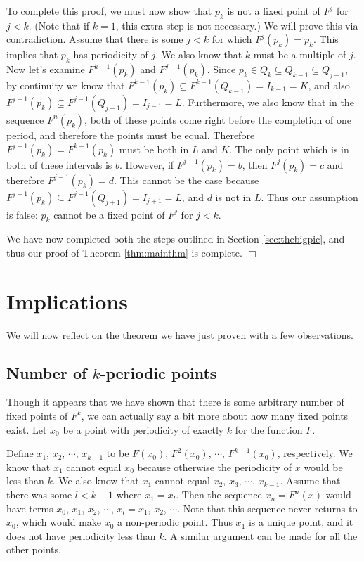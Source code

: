 \documentclass[12pt]{IEEEtran}
\begin{document}
To complete this proof, we must now show that $p_k$ is not a fixed point of $F^j$ for $j < k$. (Note that if $k = 1$, this extra step is not necessary.) We will prove this via contradiction. Assume that there is some $j < k$ for which $F^j \left( p_k \right) = p_k$. This implies that $p_k$ has periodicity of $j$. We also know that $k$ must be a multiple of $j$. Now let's examine $F^{k-1} \left( p_k \right)$ and $F^{j-1} \left( p_k \right)$. Since $p_k \in Q_k \subseteq Q_{k-1} \subseteq Q_{j-1}$, by continuity we know that $F^{k-1} \left( p_k \right) \subseteq F^{k-1} \left( Q_{k-1} \right) = I_{k-1} = K$, and also $F^{j-1} \left( p_k \right) \subseteq F^{j-1} \left( Q_{j-1} \right) = I_{j-1} = L$. Furthermore, we also know that in the sequence $F^n \left( p_k \right)$, both of these points come right before the completion of one period, and therefore the points must be equal. Therefore $F^{j-1} \left( p_k \right) = F^{k-1} \left( p_k \right)$ must be both in $L$ and $K$. The only point which is in both of these intervals is $b$. However, if $F^{j-1} \left( p_k \right) = b$, then $F^{j} \left( p_k \right) = c$ and therefore $F^{j-1} \left( p_k \right) = d$. This cannot be the case because $F^{j-1} \left( p_k \right) \subseteq F^{j-1} \left( Q_{j+1} \right) = I_{j+1} = L$, and $d$ is not in $L$. Thus our assumption is false: $p_k$ cannot be a fixed point of $F^j$ for $j < k$.

We have now completed both the steps outlined in Section \ref{sec:thebigpic}, and thus our proof of Theorem \ref{thm:mainthm} is complete. $\Box$



\section{Implications}

We will now reflect on the theorem we have just proven with a few observations.

\subsection{Number of $k$-periodic points}

Though it appears that we have shown that there is some arbitrary number of fixed points of $F^k$, we can actually say a bit more about how many fixed points exist. Let $x_0$ be a point with periodicity of exactly $k$ for the function $F$.

Define $x_1$, $x_2$, $\cdots$, $x_{k-1}$ to be $F \left( x_0 \right)$, $F^2 \left( x_0 \right)$, $\cdots$, $F^{k-1} \left( x_0 \right)$, respectively. We know that $x_1$ cannot equal $x_0$ because otherwise the periodicity of $x$ would be less than $k$. We also know that $x_1$  cannot equal $x_2$, $x_3$, $\cdots$, $x_{k-1}$. Assume that there was some $l < k-1$ where $x_1 = x_l$. Then the sequence $x_n = F^n \left( x \right)$ would have terms $x_0$, $x_1$, $x_2$, $\cdots$, $x_l = x_1$, $x_2$, $\cdots$. Note that this sequence never returns to $x_0$, which would make $x_0$ a non-periodic point. Thus $x_1$ is a unique point, and it does not have periodicity less than $k$. A similar argument can be made for all the other points.
\end{document}
